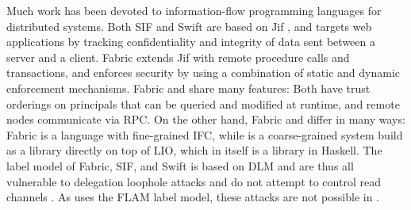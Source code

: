 Much work has been devoted to information-flow programming languages for distributed systems. Both SIF \cite{Chong:2007:SEC:1362903.1362904} and Swift \cite{Chong:2007:SWA:1294261.1294265} are based on Jif \cite{Myers:1999:JPM:292540.292561}, and targets web applications by tracking confidentiality and integrity of data sent between a server and a client. Fabric \cite{Liu:2009:FPS:1629575.1629606} extends Jif with remote procedure calls and transactions, and enforces security by using a combination of static and dynamic enforcement mechanisms. Fabric and \lang{} share many features: Both have trust orderings on principals that can be queried and modified at runtime, and remote nodes communicate via RPC. On the other hand, Fabric and \lang{} differ in many ways: Fabric is a language with fine-grained IFC, while \lang{} is a coarse-grained system build as a library directly on top of LIO, which in itself is a library in Haskell. The label model of Fabric, SIF, and Swift is based on DLM \cite{Myers:2000:PPU:363516.363526} and are thus all vulnerable to delegation loophole attacks and do not attempt to control read channels \cite{Zdancewic:2002:SPP:566340.566343}. As \lang{} uses the FLAM label model, these attacks are not possible in \lang{}.
